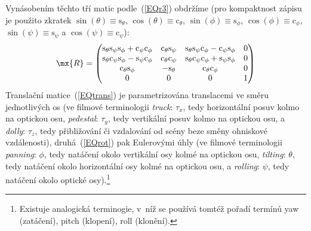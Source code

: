 Vynásobením těchto tří matic podle~(\ref{EQr3}) obdržíme (pro kompaktnost
zápisu je použito zkratek $\sin(\theta)\equiv\mathrm{s}_{\theta}$,
$\cos(\theta)\equiv\mathrm{c}_{\theta}$, $\sin(\phi)\equiv\mathrm{s}_{\phi}$,
$\cos(\phi)\equiv\mathrm{c}_{\phi}$, $\sin(\psi)\equiv\mathrm{s}_{\psi}$ a
$\cos(\psi)\equiv\mathrm{c}_{\psi}$):
\begin{equation}
  \mx{R} =
  \begin{pmatrix}
    \mathrm{s}_{\theta}\mathrm{s}_{\psi}\mathrm{s}_{\phi}
      +\mathrm{c}_{\psi}\mathrm{c}_{\phi}&
    \mathrm{c}_{\theta}\mathrm{s}_{\psi}&
    \mathrm{s}_{\theta}\mathrm{s}_{\psi}\mathrm{c}_{\phi}
      -\mathrm{c}_{\psi}\mathrm{s}_{\phi}&
    0\\
    \mathrm{s}_{\theta}\mathrm{c}_{\psi}\mathrm{s}_{\phi}
      -\mathrm{s}_{\psi}\mathrm{c}_{\phi}&
    \mathrm{c}_{\theta}\mathrm{c}_{\psi}&
    \mathrm{s}_{\theta}\mathrm{c}_{\psi}\mathrm{c}_{\phi}
      +\mathrm{s}_{\psi}\mathrm{s}_{\phi}&
    0\\
    \mathrm{c}_{\theta}\mathrm{s}_{\phi}&
    -\mathrm{s}_{\theta}&
    \mathrm{c}_{\theta}\mathrm{c}_{\phi}&
    0\\
    0&0&0&1
  \end{pmatrix}                                                    \label{EQrot}
\end{equation}
Translační matice~(\ref{EQtrans}) je parametrizována translacemi ve směru
jednotlivých os (ve filmové terminologii \emph{truck}: $\tau_{x}$, tedy
horizontální posuv kolmo na optickou osu, \emph{pedestal}: $\tau_{y}$, tedy
vertikální posuv kolmo na optickou osu, a \emph{dolly}: $\tau_{z}$, tedy
přibližování či vzdalování od scény beze směny ohniskové vzdálenosti),
druhá~(\ref{EQrot}) pak Eulerovými úhly (ve filmové terminologii
\emph{panning}: $\phi$, tedy natáčení okolo vertikální osy kolmé na optickou
osu, \emph{tilting}: $\theta$, tedy natáčení okolo horizontální osy kolmé na
optickou osu, a \emph{rolling}: $\psi$, tedy natáčení okolo optické
osy).\footnote{Existuje analogická  terminogie, v~níž se používá
  tomtéž pořadí termínů yaw (zatáčení), pitch (klopení), roll (klonění).}

